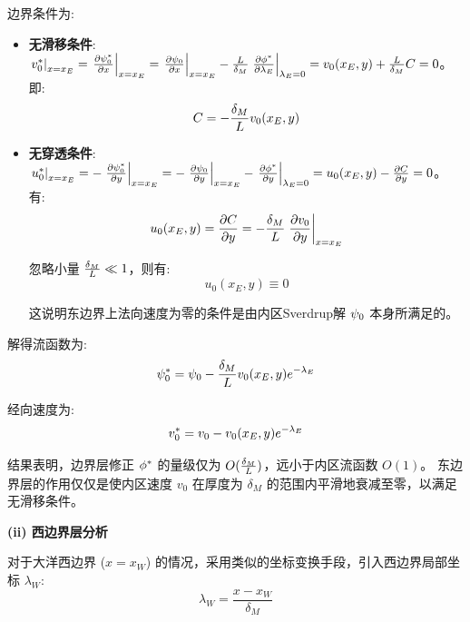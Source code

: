边界条件为:
\begin{itemize}
    \item \textbf{无滑移条件}: $\left.\flayer{v_0}\right|_{x=x_E} = \left.\pde{\flayer{\streamfunc_0}}{x}\right|_{x=x_E} = \left.\pde{\streamfunc_0}{x}\right|_{x=x_E} - \frac{\hscale}{\delta_M} \left.\pde{\flayer{\phi}}{\lambda_E}\right|_{\lambda_E=0} = v_0(x_E, y) + \frac{\hscale}{\delta_M} C = 0$。
    即:
    \begin{equation*}
        C = -\frac{\delta_M}{L} v_0(x_E, y)
    \end{equation*}

    \item \textbf{无穿透条件}: $\left.\flayer{u_0}\right|_{x=x_E} = -\left.\pde{\flayer{\streamfunc_0}}{y}\right|_{x=x_E} = -\left.\pde{\streamfunc_0}{y}\right|_{x=x_E} - \left.\pde{\flayer{\phi}}{y}\right|_{\lambda_E=0} = u_0(x_E, y) - \pde{C}{y} = 0$。
    有:
    \begin{equation*}
        u_0(x_E, y) = \pde{C}{y} = -\frac{\delta_M}{\hscale} \left.\pde{v_0}{y}\right|_{x=x_E}
    \end{equation*}

    忽略小量 $\frac{\delta_M}{L} \ll 1$，则有:
    \begin{equation}
        u_0(x_E, y) \equiv 0
        \label{eq:munk_no_penetration_east}
    \end{equation}

    这说明东边界上法向速度为零的条件是由内区Sverdrup解 $\psi_0$ 本身所满足的。
\end{itemize}

解得流函数为:
\begin{equation}
    \psi_0^* = \psi_0 - \frac{\delta_M}{L} v_0(x_E, y) e^{-\lambda_E}
    \label{eq:munk_streamfunc_solution_east}
\end{equation}

经向速度为:
\begin{equation}
    v_0^* = v_0 - v_0(x_E, y) e^{-\lambda_E}
    \label{eq:munk_v_solution_east}
\end{equation}

结果表明，边界层修正 $\phi^*$ 的量级仅为 $O(\frac{\delta_M}{L})$，远小于内区流函数 $O(1)$。
东边界层的作用仅仅是使内区速度 $v_0$ 在厚度为 $\delta_M$ 的范围内平滑地衰减至零，以满足无滑移条件。

\textbf{(ii) 西边界层分析}

对于大洋西边界 ($x = x_W$) 的情况，采用类似的坐标变换手段，引入西边界局部坐标 $\lambda_W$:
\begin{equation}
    \lambda_W = \frac{x - x_W}{\delta_M}
    \label{eq:munk_coord_west}
\end{equation}

